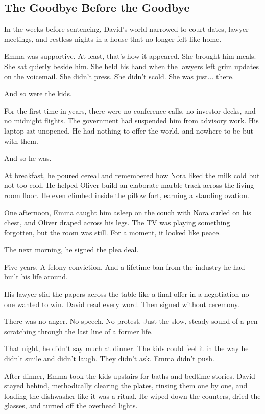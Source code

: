 
\subsection{The Goodbye Before the Goodbye}

In the weeks before sentencing, David’s world narrowed to court dates, lawyer meetings, and restless  
nights in a house that no longer felt like home.

Emma was supportive. At least, that’s how it appeared.  
She brought him meals. She sat quietly beside him. She held his hand when the lawyers left grim updates on 
the voicemail.  
She didn’t press. She didn’t scold. She was just... there.

And so were the kids.

For the first time in years, there were no conference calls, no investor decks, and no midnight flights.  
The government had suspended him from advisory work. His laptop sat unopened.  
He had nothing to offer the world, and nowhere to be but with them.

And so he was.

At breakfast, he poured cereal and remembered how Nora liked the milk cold but not too cold.  
He helped Oliver build an elaborate marble track across the living room floor. He even climbed inside 
the pillow fort, earning a standing ovation.

One afternoon, Emma caught him asleep on the couch with Nora curled on his chest, and Oliver draped  
across his legs.  
The TV was playing something forgotten, but the room was still.  
For a moment, it looked like peace.

The next morning, he signed the plea deal.

Five years.  
A felony conviction.  
And a lifetime ban from the industry he had built his life around.

His lawyer slid the papers across the table like a final offer in a negotiation no one wanted to win.  
David read every word. Then signed without ceremony.

There was no anger. No speech. No protest.  
Just the slow, steady sound of a pen scratching through the last line of a former life.

That night, he didn’t say much at dinner.  
The kids could feel it in the way he didn't smile and didn't laugh.  
They didn’t ask.  
Emma didn’t push.

After dinner, Emma took the kids upstairs for baths and bedtime stories.
David stayed behind, methodically clearing the plates, rinsing them one by one, and loading the 
dishwasher like it was a ritual.
He wiped down the counters, dried the glasses, and turned off the overhead lights.

